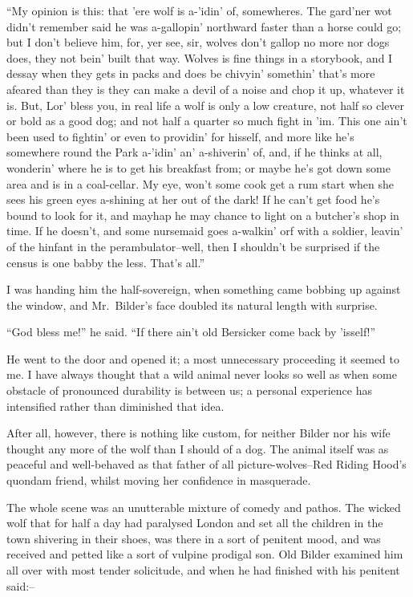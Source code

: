 \documentclass[12pt,openright]{book}
\begin{document}
“My opinion is this: that ’ere wolf is a-’idin’ of, somewheres. The gard’ner wot didn’t remember said he was a-gallopin’ northward faster than a horse could go; but I don’t believe him, for, yer see, sir, wolves don’t gallop no more nor dogs does, they not bein’ built that way. Wolves is fine things in a storybook, and I dessay when they gets in packs and does be chivyin’ somethin’ that’s more afeared than they is they can make a devil of a noise and chop it up, whatever it is. But, Lor’ bless you, in real life a wolf is only a low creature, not half so clever or bold as a good dog; and not half a quarter so much fight in ’im. This one ain’t been used to fightin’ or even to providin’ for hisself, and more like he’s somewhere round the Park a-’idin’ an’ a-shiverin’ of, and, if he thinks at all, wonderin’ where he is to get his breakfast from; or maybe he’s got down some area and is in a coal-cellar. My eye, won’t some cook get a rum start when she sees his green eyes a-shining at her out of the dark! If he can’t get food he’s bound to look for it, and mayhap he may chance to light on a butcher’s shop in time. If he doesn’t, and some nursemaid goes a-walkin’ orf with a soldier, leavin’ of the hinfant in the perambulator–well, then I shouldn’t be surprised if the census is one babby the less. That’s all.”

I was handing him the half-sovereign, when something came bobbing up against the window, and Mr. Bilder’s face doubled its natural length with surprise.

“God bless me!” he said. “If there ain’t old Bersicker come back by ’isself!”

He went to the door and opened it; a most unnecessary proceeding it seemed to me. I have always thought that a wild animal never looks so well as when some obstacle of pronounced durability is between us; a personal experience has intensified rather than diminished that idea.

After all, however, there is nothing like custom, for neither Bilder nor his wife thought any more of the wolf than I should of a dog. The animal itself was as peaceful and well-behaved as that father of all picture-wolves–Red Riding Hood’s quondam friend, whilst moving her confidence in masquerade.

The whole scene was an unutterable mixture of comedy and pathos. The wicked wolf that for half a day had paralysed London and set all the children in the town shivering in their shoes, was there in a sort of penitent mood, and was received and petted like a sort of vulpine prodigal son. Old Bilder examined him all over with most tender solicitude, and when he had finished with his penitent said:–
\end{document}
